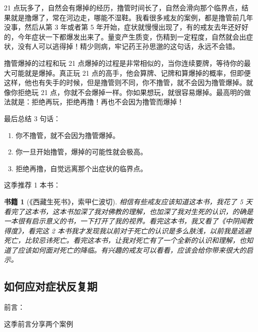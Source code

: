 \documentclass[fontset=founder]{ctexart}
\newtheorem{book}{书籍}
\begin{document}
21 点玩多了，自然会有爆掉的经历，撸管时间长了，自然会滑向那个临界点，结果就是撸爆了，常在河边走，哪能不湿鞋。我看很多戒友的案例，都是撸管前几年没事，然后从第 3 年或者第 5 年开始，症状就慢慢出现了，有的戒友去年还好好的，今年症状一下都爆发出来了。量变产生质变，伤精到一定程度，自然就会出症状，没有人可以逃得掉！精少则病，牢记药王孙思邈的这句话，永远不会错。

撸管爆掉的过程和玩 21 点爆掉的过程是非常相似的，当你连续要牌，等待你的最大可能就是爆掉。真正玩 21 点的高手，他会算牌、记牌和算爆掉的概率，但即便这样，他也有失手的时候，但是撸管则不同，你不撸管，就不会因为撸管爆掉。就像你拒绝玩 21 点，你就不会爆掉一样。你如果想玩，就很容易爆掉。最高明的做法就是：拒绝再玩，拒绝再撸！再也不会因为撸管而爆掉！

最后总结 3 句话：

\begin{enumerate}
    \item 你不撸管，就不会因为撸管爆掉。
    \item 你一旦开始撸管，爆掉的可能性就会极高。
    \item 拒绝再撸，自觉远离那个出症状的临界点。
\end{enumerate}

这季推荐 1 本书：

\begin{book}[《西藏生死书》，索甲仁波切]
    相信有些戒友应该知道这本书，我花了 5 天看完了这本书，这本书加深了我对佛教的理解，也加深了我对生死的认识，的确是一本很有启示意义的书，一下打开了我的视界。看完这本书，我又看了《中阴闻教得度》，看完这 2 本书我才发现我以前对于死亡的认识是多么肤浅，以前我是逃避死亡，比较忌讳死亡。看完这本书，让我对死亡有了一个全新的认识和理解，也知道了应该如何面对死亡的降临。有兴趣的戒友可以看看，应该会给你带来很大的启示。
\end{book}

\subsection{如何应对症状反复期}

前言：

这季前言分享两个案例
\end{document}
